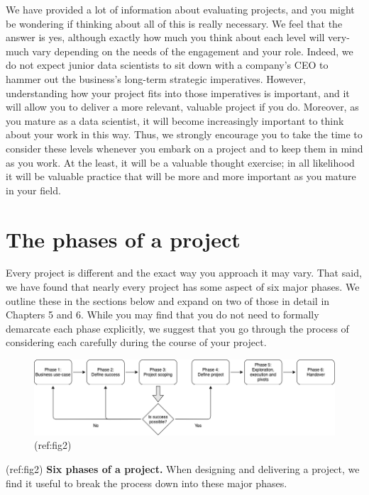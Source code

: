 \documentclass[
]{book}
\begin{document}
We have provided a lot of information about evaluating projects, and you
might be wondering if thinking about all of this is really necessary. We
feel that the answer is yes, although exactly how much you think about
each level will very-much vary depending on the needs of the engagement
and your role. Indeed, we do not expect junior data scientists to sit
down with a company's CEO to hammer out the business's long-term
strategic imperatives. However, understanding how your project fits into
those imperatives is important, and it will allow you to deliver a more
relevant, valuable project if you do. Moreover, as you mature as a data
scientist, it will become increasingly important to think about your
work in this way. Thus, we strongly encourage you to take the time to
consider these levels whenever you embark on a project and to keep them
in mind as you work. At the least, it will be a valuable thought
exercise; in all likelihood it will be valuable practice that will be
more and more important as you mature in your field.

\hypertarget{phases}{%
\chapter{The phases of a project}\label{phases}}

Every project is different and the exact way you approach it may vary.
That said, we have found that nearly every project has some aspect of
six major phases. We outline these in the sections below and expand on
two of those in detail in Chapters 5 and 6. While you may find that you
do not need to formally demarcate each phase explicitly, we suggest that
you go through the process of considering each carefully during the
course of your project.

\begin{figure}
\includegraphics[width=1\linewidth]{figures/Figure_2-phases} \caption{(ref:fig2)}\label{fig:bottom-fig}
\end{figure}

(ref:fig2) \textbf{Six phases of a project.} When designing and
delivering a project, we find it useful to break the process down into
these major phases.
\end{document}
